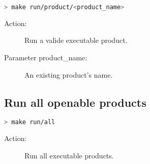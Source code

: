\begin{lstlisting}[language=bash]
> make run/product/<product_name>
\end{lstlisting}

\begin{description}
    \item[Action:] Run a valide executable product.
    \item[Parameter product\_name:] An existing product's name.
\end{description}


\subsection{Run all openable products}

\begin{lstlisting}[language=bash]
> make run/all
\end{lstlisting}

\begin{description}
    \item[Action:] Run all executable products.
\end{description}

